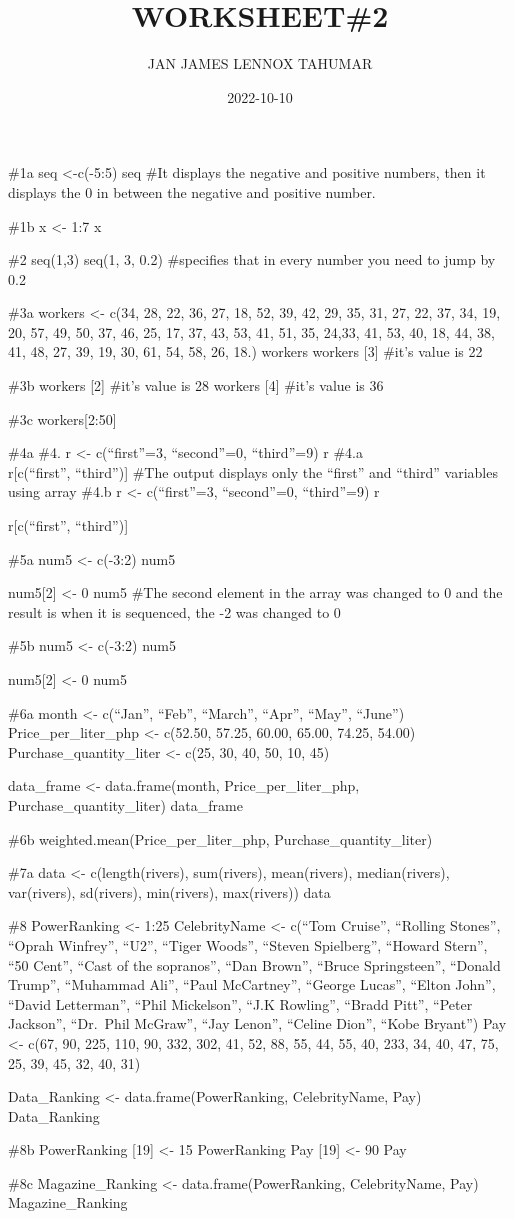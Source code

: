 \documentclass[
]{article}
\title{WORKSHEET\#2}
\author{JAN JAMES LENNOX TAHUMAR}
\date{2022-10-10}
\begin{document}
\maketitle

\#1a seq \textless-c(-5:5) seq \#It displays the negative and positive
numbers, then it displays the 0 in between the negative and positive
number.

\#1b x \textless- 1:7 x

\#2 seq(1,3) seq(1, 3, 0.2) \#specifies that in every number you need to
jump by 0.2

\#3a workers \textless- c(34, 28, 22, 36, 27, 18, 52, 39, 42, 29, 35,
31, 27, 22, 37, 34, 19, 20, 57, 49, 50, 37, 46, 25, 17, 37, 43, 53, 41,
51, 35, 24,33, 41, 53, 40, 18, 44, 38, 41, 48, 27, 39, 19, 30, 61, 54,
58, 26, 18.) workers workers {[}3{]} \#it's value is 22

\#3b workers {[}2{]} \#it's value is 28 workers {[}4{]} \#it's value is
36

\#3c workers{[}2:50{]}

\#4a \#4. r \textless- c(``first''=3, ``second''=0, ``third''=9) r
\#4.a\\
r{[}c(``first'', ``third''){]} \#The output displays only the ``first''
and ``third'' variables using array \#4.b r \textless- c(``first''=3,
``second''=0, ``third''=9) r

r{[}c(``first'', ``third''){]}

\#5a num5 \textless- c(-3:2) num5

num5{[}2{]} \textless- 0 num5 \#The second element in the array was
changed to 0 and the result is when it is sequenced, the -2 was changed
to 0

\#5b num5 \textless- c(-3:2) num5

num5{[}2{]} \textless- 0 num5

\#6a month \textless- c(``Jan'', ``Feb'', ``March'', ``Apr'', ``May'',
``June'') Price\_per\_liter\_php \textless- c(52.50, 57.25, 60.00,
65.00, 74.25, 54.00) Purchase\_quantity\_liter \textless- c(25, 30, 40,
50, 10, 45)

data\_frame \textless- data.frame(month, Price\_per\_liter\_php,
Purchase\_quantity\_liter) data\_frame

\#6b weighted.mean(Price\_per\_liter\_php, Purchase\_quantity\_liter)

\#7a data \textless- c(length(rivers), sum(rivers), mean(rivers),
median(rivers), var(rivers), sd(rivers), min(rivers), max(rivers)) data

\#8 PowerRanking \textless- 1:25 CelebrityName \textless- c(``Tom
Cruise'', ``Rolling Stones'', ``Oprah Winfrey'', ``U2'', ``Tiger
Woods'', ``Steven Spielberg'', ``Howard Stern'', ``50 Cent'', ``Cast of
the sopranos'', ``Dan Brown'', ``Bruce Springsteen'', ``Donald Trump'',
``Muhammad Ali'', ``Paul McCartney'', ``George Lucas'', ``Elton John'',
``David Letterman'', ``Phil Mickelson'', ``J.K Rowling'', ``Bradd
Pitt'', ``Peter Jackson'', ``Dr.~Phil McGraw'', ``Jay Lenon'', ``Celine
Dion'', ``Kobe Bryant'') Pay \textless- c(67, 90, 225, 110, 90, 332,
302, 41, 52, 88, 55, 44, 55, 40, 233, 34, 40, 47, 75, 25, 39, 45, 32,
40, 31)

Data\_Ranking \textless- data.frame(PowerRanking, CelebrityName, Pay)
Data\_Ranking

\#8b PowerRanking {[}19{]} \textless- 15 PowerRanking Pay {[}19{]}
\textless- 90 Pay

\#8c Magazine\_Ranking \textless- data.frame(PowerRanking,
CelebrityName, Pay) Magazine\_Ranking
\end{document}
